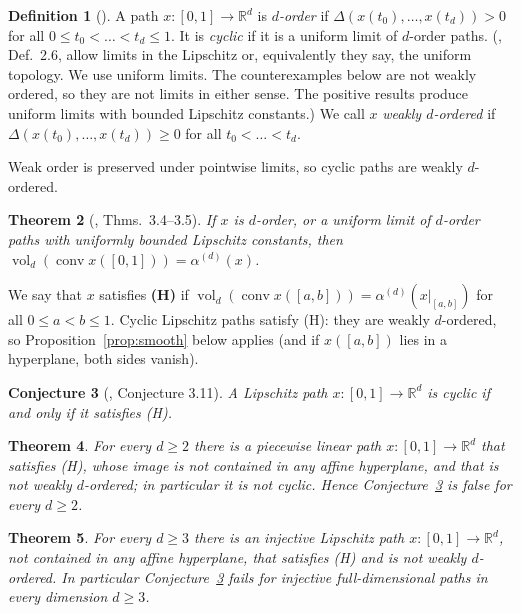 \documentclass[11pt]{amsart}
\newtheorem{theorem}{Theorem}
\newtheorem{conjecture}[theorem]{Conjecture}
\theoremstyle{definition}
\newtheorem{definition}[theorem]{Definition}
\newcommand{\R}{\mathbb{R}}
\newcommand{\conv}{\operatorname{conv}}
\newcommand{\vol}{\operatorname{vol}}
\begin{document}
\begin{definition}[\cite{ALM}]
A path $x:[0,1]\to\R^d$ is \emph{$d$-order} if $\Delta(x(t_0),\dots,x(t_d))>0$ for all $0\le t_0<\dots<t_d\le1$.
It is \emph{cyclic} if it is a uniform limit of $d$-order paths. (\cite{ALM}, Def.~2.6, allow limits in the Lipschitz or, equivalently they say, the
uniform topology. We use uniform limits. The counterexamples below are not weakly ordered, so they are not limits in either sense. The positive results produce
uniform limits with bounded Lipschitz constants.)
We call $x$ \emph{weakly $d$-ordered} if $\Delta(x(t_0),\dots,x(t_d))\ge0$ for all $t_0<\dots<t_d$.
\end{definition}

Weak order is preserved under pointwise limits, so cyclic paths are weakly $d$-ordered.

\begin{theorem}[\cite{ALM}, Thms.\ 3.4--3.5]\label{thm:ALM}
If $x$ is $d$-order, or a uniform limit of $d$-order paths with uniformly bounded Lipschitz constants, then
$\vol_d(\conv x([0,1]))=\alpha^{(d)}(x)$.
\end{theorem}

We say that $x$ satisfies \textbf{(H)} if $\vol_d(\conv x([a,b]))=\alpha^{(d)}(x|_{[a,b]})$ for all $0\le a<b\le1$.
Cyclic Lipschitz paths satisfy (H): they are weakly $d$-ordered, so Proposition~\ref{prop:smooth} below applies (and if $x([a,b])$ lies in a hyperplane, both sides vanish).

\begin{conjecture}[\cite{ALM}, Conjecture 3.11]\label{conj:ALM}
A Lipschitz path $x:[0,1]\to\R^d$ is cyclic if and only if it satisfies (H).
\end{conjecture}

\begin{theorem}\label{thm:counter}
For every $d\ge2$ there is a piecewise linear path $x:[0,1]\to\R^d$ that satisfies (H), whose image is not contained in any
affine hyperplane, and that is not weakly $d$-ordered; in particular it is not cyclic. Hence Conjecture~\ref{conj:ALM} is false for every $d\ge2$.
\end{theorem}

\begin{theorem}\label{thm:inj}
For every $d\ge3$ there is an injective Lipschitz path $x:[0,1]\to\R^d$, not contained in any affine hyperplane, that satisfies (H) and is not weakly $d$-ordered.
In particular Conjecture~\ref{conj:ALM} fails for injective full-dimensional paths in every dimension $d\ge3$.
\end{theorem}
\end{document}
